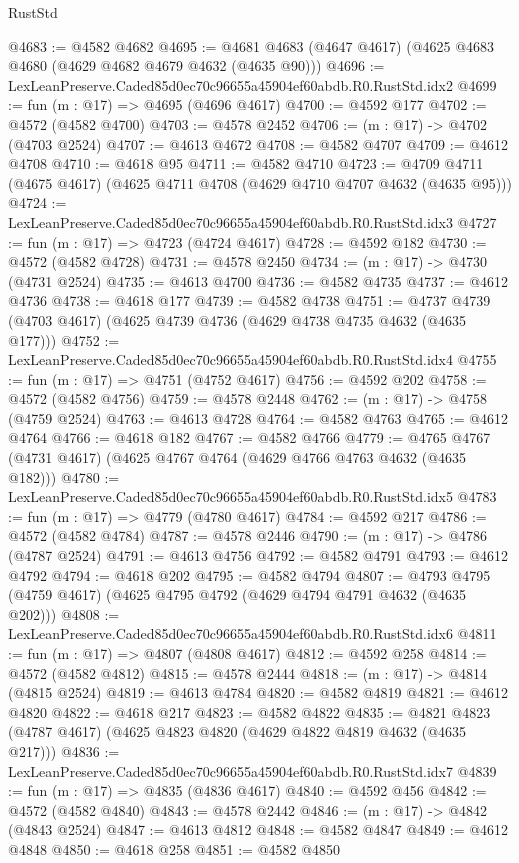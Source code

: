 \begin{lexlean}{RustStd}
\begin{coremodule}
@4683 := @4582 @4682
@4695 := @4681 @4683 (@4647 @4617) (@4625 @4683 @4680 (@4629 @4682 @4679 @4632 (@4635 @90)))
@4696 := LexLeanPreserve.Caded85d0ec70c96655a45904ef60abdb.R0.RustStd.idx2
@4699 := fun (m : @17) => @4695 (@4696 @4617)
@4700 := @4592 @177
@4702 := @4572 (@4582 @4700)
@4703 := @4578 @2452
@4706 := (m : @17) -> @4702 (@4703 @2524)
@4707 := @4613 @4672
@4708 := @4582 @4707
@4709 := @4612 @4708
@4710 := @4618 @95
@4711 := @4582 @4710
@4723 := @4709 @4711 (@4675 @4617) (@4625 @4711 @4708 (@4629 @4710 @4707 @4632 (@4635 @95)))
@4724 := LexLeanPreserve.Caded85d0ec70c96655a45904ef60abdb.R0.RustStd.idx3
@4727 := fun (m : @17) => @4723 (@4724 @4617)
@4728 := @4592 @182
@4730 := @4572 (@4582 @4728)
@4731 := @4578 @2450
@4734 := (m : @17) -> @4730 (@4731 @2524)
@4735 := @4613 @4700
@4736 := @4582 @4735
@4737 := @4612 @4736
@4738 := @4618 @177
@4739 := @4582 @4738
@4751 := @4737 @4739 (@4703 @4617) (@4625 @4739 @4736 (@4629 @4738 @4735 @4632 (@4635 @177)))
@4752 := LexLeanPreserve.Caded85d0ec70c96655a45904ef60abdb.R0.RustStd.idx4
@4755 := fun (m : @17) => @4751 (@4752 @4617)
@4756 := @4592 @202
@4758 := @4572 (@4582 @4756)
@4759 := @4578 @2448
@4762 := (m : @17) -> @4758 (@4759 @2524)
@4763 := @4613 @4728
@4764 := @4582 @4763
@4765 := @4612 @4764
@4766 := @4618 @182
@4767 := @4582 @4766
@4779 := @4765 @4767 (@4731 @4617) (@4625 @4767 @4764 (@4629 @4766 @4763 @4632 (@4635 @182)))
@4780 := LexLeanPreserve.Caded85d0ec70c96655a45904ef60abdb.R0.RustStd.idx5
@4783 := fun (m : @17) => @4779 (@4780 @4617)
@4784 := @4592 @217
@4786 := @4572 (@4582 @4784)
@4787 := @4578 @2446
@4790 := (m : @17) -> @4786 (@4787 @2524)
@4791 := @4613 @4756
@4792 := @4582 @4791
@4793 := @4612 @4792
@4794 := @4618 @202
@4795 := @4582 @4794
@4807 := @4793 @4795 (@4759 @4617) (@4625 @4795 @4792 (@4629 @4794 @4791 @4632 (@4635 @202)))
@4808 := LexLeanPreserve.Caded85d0ec70c96655a45904ef60abdb.R0.RustStd.idx6
@4811 := fun (m : @17) => @4807 (@4808 @4617)
@4812 := @4592 @258
@4814 := @4572 (@4582 @4812)
@4815 := @4578 @2444
@4818 := (m : @17) -> @4814 (@4815 @2524)
@4819 := @4613 @4784
@4820 := @4582 @4819
@4821 := @4612 @4820
@4822 := @4618 @217
@4823 := @4582 @4822
@4835 := @4821 @4823 (@4787 @4617) (@4625 @4823 @4820 (@4629 @4822 @4819 @4632 (@4635 @217)))
@4836 := LexLeanPreserve.Caded85d0ec70c96655a45904ef60abdb.R0.RustStd.idx7
@4839 := fun (m : @17) => @4835 (@4836 @4617)
@4840 := @4592 @456
@4842 := @4572 (@4582 @4840)
@4843 := @4578 @2442
@4846 := (m : @17) -> @4842 (@4843 @2524)
@4847 := @4613 @4812
@4848 := @4582 @4847
@4849 := @4612 @4848
@4850 := @4618 @258
@4851 := @4582 @4850

\end{coremodule}
\end{lexlean}

